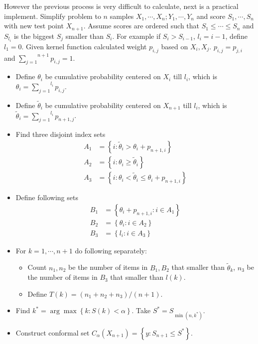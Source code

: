\documentclass[12pt, a4paper, oneside]{article}
\begin{document}
    However the previous process is very difficult to calculate, next is a practical implement. Simplify problem to $n$ samples $X_1,\cdots,X_n;Y_1,\cdots,Y_n$ and score $S_1,\cdots,S_n$ with new test point $X_{n+1}$. Assume scores are ordered such that $S_1\leq\cdots\leq S_n$ and $S_{l_i}$ is the biggest $S_j$ smaller than $S_i$. For example if $S_i>S_{i-1}$, $l_i=i-1$, define $l_1=0$. Given kernel function calculated weight $p_{i,j}$ based on $X_i,X_j$. $p_{i,j}=p_{j,i}$ and $\overset{n+1}{\underset{j=1}\sum}p_{i,j}=1$.
    \begin{itemize}
        \item Define $\theta_i$ be cumulative probability centered on $X_i$ till $l_i$, which is $\theta_i=\overset{l_i}{\underset{j=1}\sum}p_{i,j}$.
        \item Define $\tilde{\theta}_i$ be cumulative probability centered on $X_{n+1}$ till $l_i$, which is $\tilde{\theta}_i=\overset{l_i}{\underset{j=1}\sum}p_{n+1,j}$.
        \item Find three disjoint index sets
        \begin{align*}
            A_1&=\left\{ i:\tilde{\theta}_i>\theta_i+p_{n+1,i} \right\}\\
            A_2&=\left\{ i:\theta_i\geq\tilde{\theta}_i \right\}\\
            A_3&=\left\{ i:\theta_i<\tilde{\theta}_i\leq\theta_i+p_{n+1,i} \right\}
        \end{align*}
        \item Define following sets
        \begin{align*}
            B_1&=\left\{ \theta_i+p_{n+1,i}:i\in A_1 \right\}\\
            B_2&=\left\{ \theta_i:i\in A_2 \right\}\\
            B_3&=\left\{ l_i:i\in A_3 \right\}
        \end{align*}
        \item For $k=1,\cdots,n+1$ do following separately:
        \begin{itemize}
            \item Count $n_1,n_2$ be the number of items in $B_1,B_2$ that smaller than $\tilde{\theta}_k$, $n_3$ be the number of items in $B_3$ that smaller than $l(k)$.
            \item Define $T(k)=(n_1+n_2+n_3)/(n+1)$.
        \end{itemize}
        \item Find $k^*=\arg\max\left\{ k:S(k)<\alpha \right\}$. Take $S^*=S_{\min(n,k^*)}$.
        \item Construct conformal set $C_\alpha(X_{n+1})=\left\{ y:S_{n+1}\leq S^* \right\}$.
    \end{itemize}

\newpage


\end{document}
